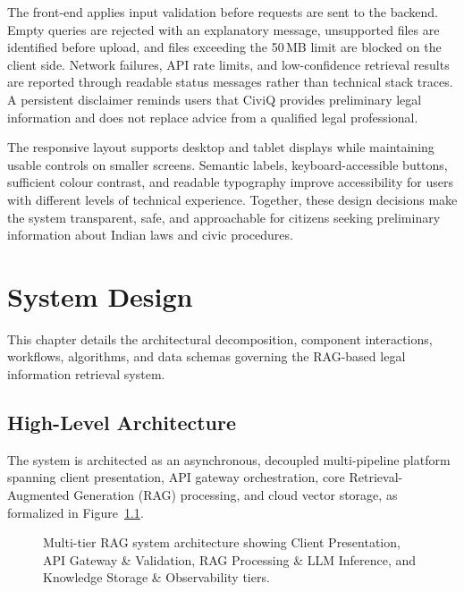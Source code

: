 \documentclass[12pt,a4paper]{report}
\begin{document}
The front-end applies input validation before requests are sent to the backend. Empty queries are rejected with an explanatory message, unsupported files are identified before upload, and files exceeding the 50\,MB limit are blocked on the client side. Network failures, API rate limits, and low-confidence retrieval results are reported through readable status messages rather than technical stack traces. A persistent disclaimer reminds users that CiviQ provides preliminary legal information and does not replace advice from a qualified legal professional.

The responsive layout supports desktop and tablet displays while maintaining usable controls on smaller screens. Semantic labels, keyboard-accessible buttons, sufficient colour contrast, and readable typography improve accessibility for users with different levels of technical experience. Together, these design decisions make the system transparent, safe, and approachable for citizens seeking preliminary information about Indian laws and civic procedures.


\chapter{System Design}

This chapter details the architectural decomposition, component interactions, workflows, algorithms, and data schemas governing the RAG-based legal information retrieval system.

\section{High-Level Architecture}
The system is architected as an asynchronous, decoupled multi-pipeline platform spanning client presentation, API gateway orchestration, core Retrieval-Augmented Generation (RAG) processing, and cloud vector storage, as formalized in Figure~\ref{fig:system_arch_detailed}.

\begin{figure}[htbp]
    \centering
    \caption{Multi-tier RAG system architecture showing Client Presentation, API Gateway \& Validation, RAG Processing \& LLM Inference, and Knowledge Storage \& Observability tiers.}
    \label{fig:system_arch_detailed}
\end{figure}
\end{document}
